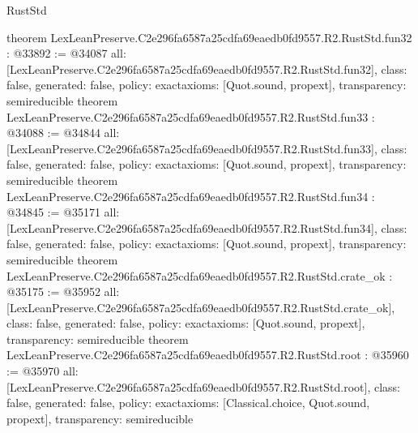 \begin{lexlean}{RustStd}
\begin{coremodule}
{}
theorem LexLeanPreserve.C2e296fa6587a25cdfa69eaedb0fd9557.R2.RustStd.fun32 : @33892 := @34087 {
  all: [LexLeanPreserve.C2e296fa6587a25cdfa69eaedb0fd9557.R2.RustStd.fun32],
  class: false,
  generated: false,
  policy: exact{axioms: [Quot.sound, propext]},
  transparency: semireducible
}
theorem LexLeanPreserve.C2e296fa6587a25cdfa69eaedb0fd9557.R2.RustStd.fun33 : @34088 := @34844 {
  all: [LexLeanPreserve.C2e296fa6587a25cdfa69eaedb0fd9557.R2.RustStd.fun33],
  class: false,
  generated: false,
  policy: exact{axioms: [Quot.sound, propext]},
  transparency: semireducible
}
theorem LexLeanPreserve.C2e296fa6587a25cdfa69eaedb0fd9557.R2.RustStd.fun34 : @34845 := @35171 {
  all: [LexLeanPreserve.C2e296fa6587a25cdfa69eaedb0fd9557.R2.RustStd.fun34],
  class: false,
  generated: false,
  policy: exact{axioms: [Quot.sound, propext]},
  transparency: semireducible
}
theorem LexLeanPreserve.C2e296fa6587a25cdfa69eaedb0fd9557.R2.RustStd.crate_ok : @35175 := @35952 {
  all: [LexLeanPreserve.C2e296fa6587a25cdfa69eaedb0fd9557.R2.RustStd.crate_ok],
  class: false,
  generated: false,
  policy: exact{axioms: [Quot.sound, propext]},
  transparency: semireducible
}
theorem LexLeanPreserve.C2e296fa6587a25cdfa69eaedb0fd9557.R2.RustStd.root : @35960 := @35970 {
  all: [LexLeanPreserve.C2e296fa6587a25cdfa69eaedb0fd9557.R2.RustStd.root],
  class: false,
  generated: false,
  policy: exact{axioms: [Classical.choice, Quot.sound, propext]},
  transparency: semireducible
}


\end{coremodule}
\end{lexlean}
